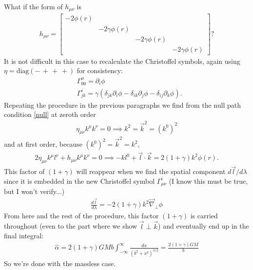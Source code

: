 \documentclass{book}
\theoremstyle{definition}
\newcommand{\p}{\partial}
\newcommand{\nn}{\nonumber}
\newcommand{\f}[2]{\frac{#1}{#2}}
\newcommand{\lp}{\left(}
\newcommand{\rp}{\right)}
\begin{document}
What if the form of $h_{\mu\nu}$ is 
\begin{align}
{h_{\mu\nu}= \begin{bmatrix}
	-2\phi(r) & &&\\
	&-2\gamma\phi(r)&&\\
	&&-2\gamma\phi(r)&\\
	&&&-2\gamma\phi(r)
	\end{bmatrix}}?
\end{align}
It is not difficult in this case to recalculate the Christoffel symbols, again using $\eta = \text{diag}(-\,+\,+\,+)$ for consistency:
\begin{align}
&\Gamma^\mu_{00} = \p_i \phi\nn\\
&\Gamma^i_{jk} =  \gamma\lp \delta_{jk}\p_i \phi - \delta_{ik}\p_j \phi - \delta_{ij}\p_k \phi\rp.
\end{align}
Repeating the procedure in the previous paragraphs we find from the null path condition \eqref{null} at zeroth order
\begin{align}
\eta_{\mu\nu}k^\mu k^\nu = 0\implies k^2 = \vec{k}^2 = \lp k^0 \rp^2
\end{align}
and at first order, because $\lp k^0 \rp^2 = \vec{k}^2 = k^2$,
\begin{align}
2\eta_{\mu\nu}k^\mu l^\nu + h_{\mu\nu}k^\mu k^\nu = 0 \implies -kl^0 + \vec{l}\cdot \vec{k} = 2(1+\gamma)k^2\phi(r).
\end{align}    
This factor of $(1+\gamma)$ will reappear when we find the spatial component $d\vec{l}/d\lambda$ since it is embedded in the new Christoffel symbol $\Gamma^i_{\mu\nu}$ (I know this must be true, but I won't verify...)
\begin{align}
\boxed{\f{d\vec{l}}{d\lambda} = -2(1+\gamma)k^2 \vec{\nabla}_\perp \phi}
\end{align}
From here and the rest of the procedure, this factor $(1+\gamma)$ is carried throughout (even to the part where we show $\vec{l}\perp \vec{k}$) and eventually end up in the final integral:
\begin{align}
\boxed{\hat{\alpha} = 2(1+\gamma)GMb\int_{-\infty}^\infty \f{dx}{(b^2 + x^2)^{3/2}} = \f{2(1+\gamma)GM}{b}}
\end{align}
So we're done with the massless case. \qedhere \\
\end{document}
